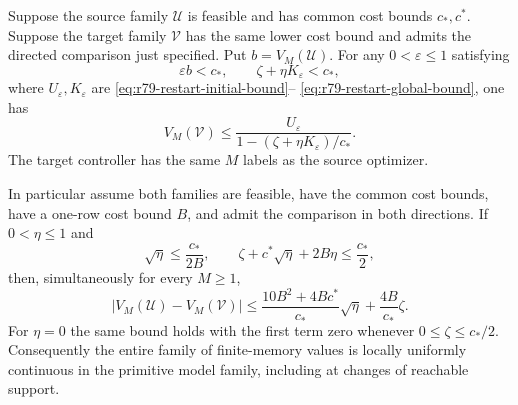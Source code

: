 \begin{theorem}
\label{thm:r79-frontier-stability}
Suppose the source family $\mathcal U$ is feasible and has common
cost bounds $c_*,c^*$.  Suppose the target family $\mathcal V$ has
the same lower cost bound and admits the directed comparison just
specified.  Put $b=V_M(\mathcal U)$.  For any
$0<\varepsilon\le1$ satisfying
\[
 \varepsilon b<c_*,\qquad
 \zeta+\eta K_\varepsilon<c_*,
\]
where $U_\varepsilon,K_\varepsilon$ are
\eqref{eq:r79-restart-initial-bound}--
\eqref{eq:r79-restart-global-bound}, one has
\begin{equation}\label{eq:r79-directed-stability}
 V_M(\mathcal V)
       \le\frac{U_\varepsilon}
                 {1-(\zeta+\eta K_\varepsilon)/c_*}.
\end{equation}
The target controller has the same $M$ labels as the source
optimizer.

In particular assume both families are feasible, have the common
cost bounds, have a one-row cost bound $B$, and admit the comparison
in both directions.  If $0<\eta\le1$ and
\begin{equation}\label{eq:r79-stability-smallness}
 \sqrt\eta\le\frac{c_*}{2B},\qquad
 \zeta+c^*\sqrt\eta+2B\eta\le\frac{c_*}{2},
\end{equation}
then, simultaneously for every $M\ge1$,
\begin{equation}\label{eq:r79-uniform-modulus}
 |V_M(\mathcal U)-V_M(\mathcal V)|
 \le\frac{10B^2+4Bc^*}{c_*}\sqrt\eta
                       +\frac{4B}{c_*}\zeta.
\end{equation}
For $\eta=0$ the same bound holds with the first term zero whenever
$0\le\zeta\le c_*/2$.
Consequently the entire family of finite-memory values is locally
uniformly continuous in the primitive model family, including at
changes of reachable support.
\end{theorem}
